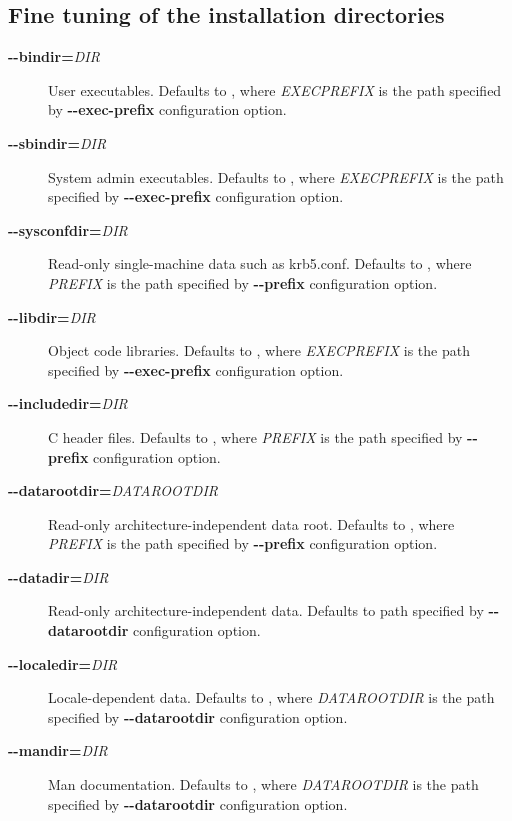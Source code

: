 \documentclass[letterpaper,10pt,english]{sphinxmanual}
\begin{document}
\subsection{Fine tuning of the installation directories}
\label{build/options2configure:fine-tuning-of-the-installation-directories}\begin{description}
\item[{\textbf{-}\textbf{-bindir=}\emph{DIR}}] \leavevmode
User executables.  Defaults to , where
\emph{EXECPREFIX} is the path specified by \textbf{-}\textbf{-exec-prefix}
configuration option.

\item[{\textbf{-}\textbf{-sbindir=}\emph{DIR}}] \leavevmode
System admin executables.  Defaults to , where
\emph{EXECPREFIX} is the path specified by \textbf{-}\textbf{-exec-prefix}
configuration option.

\item[{\textbf{-}\textbf{-sysconfdir=}\emph{DIR}}] \leavevmode
Read-only single-machine data such as krb5.conf.
Defaults to , where
\emph{PREFIX} is the path specified by \textbf{-}\textbf{-prefix} configuration
option.

\item[{\textbf{-}\textbf{-libdir=}\emph{DIR}}] \leavevmode
Object code libraries.  Defaults to , where
\emph{EXECPREFIX} is the path specified by \textbf{-}\textbf{-exec-prefix}
configuration option.

\item[{\textbf{-}\textbf{-includedir=}\emph{DIR}}] \leavevmode
C header files.  Defaults to , where \emph{PREFIX} is
the path specified by \textbf{-}\textbf{-prefix} configuration option.

\item[{\textbf{-}\textbf{-datarootdir=}\emph{DATAROOTDIR}}] \leavevmode
Read-only architecture-independent data root.  Defaults to
, where \emph{PREFIX} is the path specified by
\textbf{-}\textbf{-prefix} configuration option.

\item[{\textbf{-}\textbf{-datadir=}\emph{DIR}}] \leavevmode
Read-only architecture-independent data.  Defaults to path
specified by \textbf{-}\textbf{-datarootdir} configuration option.

\item[{\textbf{-}\textbf{-localedir=}\emph{DIR}}] \leavevmode
Locale-dependent data.  Defaults to , where
\emph{DATAROOTDIR} is the path specified by \textbf{-}\textbf{-datarootdir}
configuration option.

\item[{\textbf{-}\textbf{-mandir=}\emph{DIR}}] \leavevmode
Man documentation.  Defaults to , where
\emph{DATAROOTDIR} is the path specified by \textbf{-}\textbf{-datarootdir}
configuration option.

\end{description}
\end{document}
